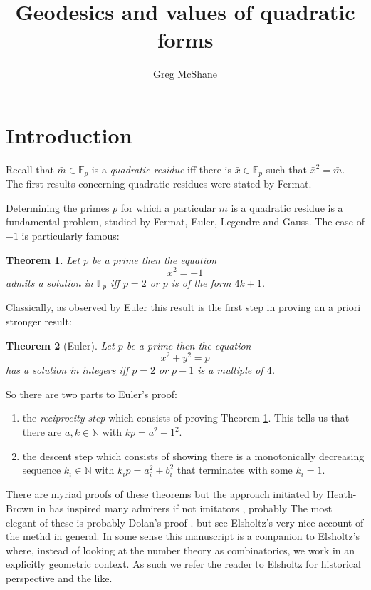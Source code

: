 \documentclass[12pt,a4paper]{amsart}
\title{Geodesics and values of quadratic forms}
\author[McShane]{Greg McShane}
\newtheorem{thm}{Theorem}[section]
\def\GG{\mathbb{G}}
\def\fp{\mathbb{F}_p}
\begin{document}
\maketitle

\section{Introduction}


Recall
that $\bar{m}\in \fp$ is a \textit{quadratic residue} iff
there is $\bar{x}\in \fp $ such that $\bar{x}^2 = \bar{m}$.
The first results concerning quadratic residues were stated by
Fermat. 

Determining the primes $p$ for which a particular $m$ is a quadratic
residue is a fundamental problem, studied by Fermat, Euler, Legendre
and Gauss. The case of $-1$ is particularly famous:

\begin{thm}\label{triv}
Let $p$ be a prime then the equation
$$\bar{x}^2 = -1$$
admits a solution in $\fp$ iff 
$p =2$ or $p$ is of the form $4k+1$.
\end{thm}

Classically, as observed by Euler this result is the first step in proving an a priori stronger result:


\begin{thm}[Euler]\label{main}
Let $p$ be a prime then the equation
$$x^2 + y^2 = p $$
has a solution in integers  
iff  $p =2$ or $p-1$ is a multiple of $4$.
\end{thm}

\noindent
So there are two parts to Euler's proof:
\begin{enumerate}
	\item the \textit{reciprocity step} which consists of
		proving Theorem \ref{triv}. This tells us
		that there are $a,k \in \mathbb{N}$ with $kp = a^2 +1^2$.
	\item the {descent step} which consists of showing
		there is a  monotonically decreasing sequence
		$k_i \in \mathbb{N}$ with $k_ip = a_i^2 +b_i^2$
		that terminates with some $k_i=1$.
\end{enumerate}

There are myriad proofs of these theorems but the approach initiated
by Heath-Brown in \cite{heath} has inspired many admirers if not
imitators \cite{generalov, jackson,northshield, dubach}, probably
The most elegant of these is probably Dolan's proof \cite{dolan}.
but see Elsholtz's very nice account \cite{elsholtz} of the methd in
general. In some sense this manuscript is a companion to Elsholtz's
where, instead of looking at the number theory as combinatorics, we
work in an explicitly geometric context. As such we refer the reader
to Elsholtz for historical perspective and the like. 
\end{document}

